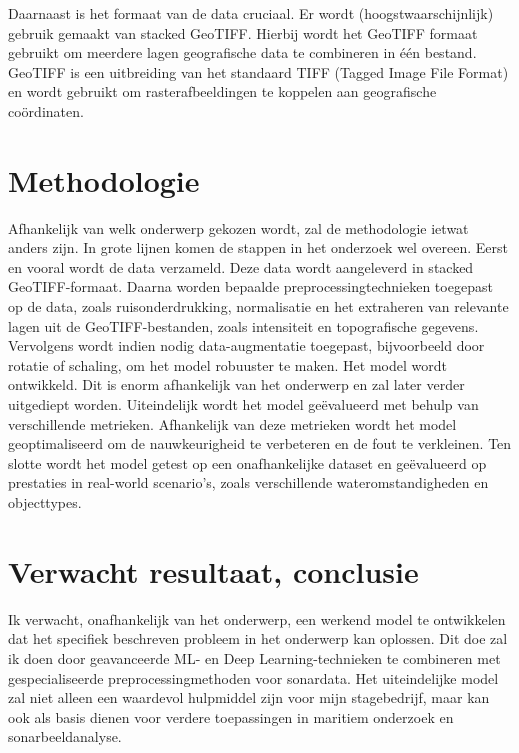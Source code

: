 Daarnaast is het formaat van de data cruciaal. Er wordt (hoogstwaarschijnlijk) gebruik gemaakt van stacked GeoTIFF. Hierbij wordt het GeoTIFF formaat gebruikt om meerdere lagen geografische data te combineren in één bestand. GeoTIFF is een uitbreiding van het standaard TIFF (Tagged Image File Format) en wordt gebruikt om rasterafbeeldingen te koppelen aan geografische coördinaten. \autocite{Ritter_1997}


\section{Methodologie}%
\label{sec:methodologie}

Afhankelijk van welk onderwerp gekozen wordt, zal de methodologie ietwat anders zijn. In grote lijnen komen de stappen in het onderzoek wel overeen. Eerst en vooral wordt de data verzameld. Deze data wordt aangeleverd in stacked GeoTIFF-formaat. Daarna worden bepaalde preprocessingtechnieken toegepast op de data, zoals ruisonderdrukking, normalisatie en het extraheren van relevante lagen uit de GeoTIFF-bestanden, zoals intensiteit en topografische gegevens. Vervolgens wordt indien nodig data-augmentatie toegepast, bijvoorbeeld door rotatie of schaling, om het model robuuster te maken. Het model wordt ontwikkeld. Dit is enorm afhankelijk van het onderwerp en zal later verder uitgediept worden. Uiteindelijk wordt het model geëvalueerd met behulp van verschillende metrieken. Afhankelijk van deze metrieken wordt het model geoptimaliseerd om de nauwkeurigheid te verbeteren en de fout te verkleinen. Ten slotte wordt het model getest op een onafhankelijke dataset en geëvalueerd op prestaties in real-world scenario's, zoals verschillende wateromstandigheden en objecttypes.

\section{Verwacht resultaat, conclusie}%
\label{sec:verwachte_resultaten}

Ik verwacht, onafhankelijk van het onderwerp, een werkend model te ontwikkelen dat het specifiek beschreven probleem in het onderwerp kan oplossen. Dit doe zal ik doen door geavanceerde ML- en Deep Learning-technieken te combineren met gespecialiseerde preprocessingmethoden voor sonardata. Het uiteindelijke model zal niet alleen een waardevol hulpmiddel zijn voor mijn stagebedrijf, maar kan ook als basis dienen voor verdere toepassingen in maritiem onderzoek en sonarbeeldanalyse.

